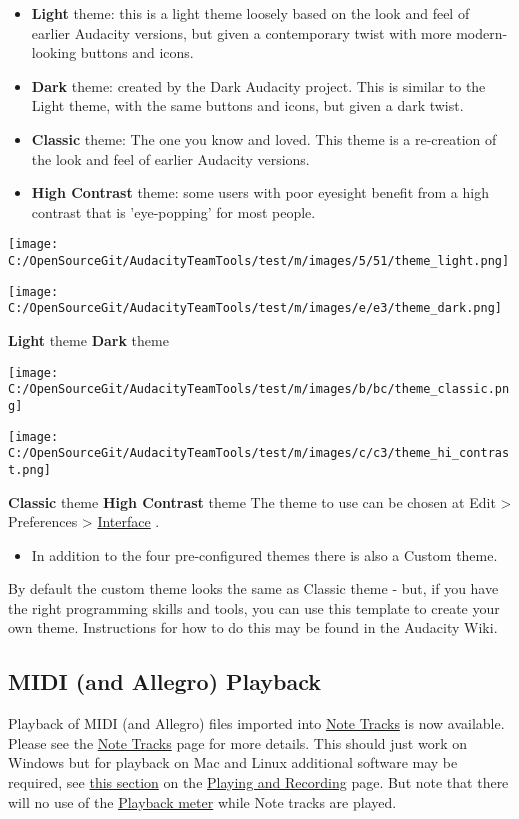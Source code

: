 \begin{multicols}{2}
\begin{itemize}
\item \textbf{Light} theme: this is a light theme loosely based on the look and feel of earlier Audacity versions, but given a contemporary twist with more modern-looking buttons and icons. 
\item \textbf{Dark} theme: created by the Dark Audacity project. This is similar to the Light theme, with the same buttons and icons, but given a dark twist.
\item \textbf{Classic} theme: The one you know and loved. This theme is a re-creation of the look and feel of earlier Audacity versions. 
\item \textbf{High Contrast} theme: some users with poor eyesight benefit from a high contrast that is 'eye-popping' for most people.
\end{itemize}
\par \protect\texttt{[image: C:/OpenSourceGit/AudacityTeamTools/test/m/images/5/51/theme\_light.png]}\par \par \protect\texttt{[image: C:/OpenSourceGit/AudacityTeamTools/test/m/images/e/e3/theme\_dark.png]}\par \textbf{Light} theme
\textbf{Dark} theme
\par \protect\texttt{[image: C:/OpenSourceGit/AudacityTeamTools/test/m/images/b/bc/theme\_classic.png]}\par \par \protect\texttt{[image: C:/OpenSourceGit/AudacityTeamTools/test/m/images/c/c3/theme\_hi\_contrast.png]}\par \textbf{Classic} theme
\textbf{High Contrast} theme
The theme to use can be chosen at Edit > Preferences > 
\hyperref[\foo{interfaceXpreferencesX}]{Interface}
.  

\begin{itemize}
\item  In addition to the four pre-configured themes there is also a Custom theme.  
\end{itemize}
 By default the custom theme looks the same as Classic theme - but, if you have the right programming skills and tools, you can use this template to create your own theme.  Instructions for how to do this may be found in the Audacity Wiki.
\label{newXfeaturesXinXthisXreleaseXmidi}
\subsection{MIDI (and Allegro) Playback}Playback of MIDI (and Allegro) files imported into 
\hyperref[\foo{noteXtracksX}]{Note Tracks}
 is now available.  Please see the 
\hyperref[\foo{noteXtracksX}]{Note Tracks}
 page for more details.
This should just work on Windows but for playback on Mac and Linux additional software may be required, see 
\hyperref[\foo{playingXandXrecordingXmidi}]{this section}
 on the 
\hyperref[\foo{playingXandXrecordingX}]{Playing and Recording}
 page.
But note that there will no use of the 
\hyperref[\foo{meterXtoolbarXplayback}]{Playback meter}
 while Note tracks are played. 


\end{multicols}
